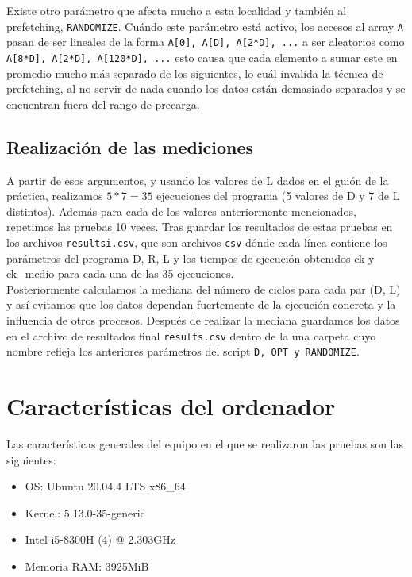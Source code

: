 \documentclass[a4paper,twocolumn]{article}
\begin{document}
    Existe otro parámetro que afecta mucho a esta localidad y también al prefetching, \texttt{RANDOMIZE}. Cuándo este parámetro está activo, los accesos al array \texttt{A} pasan de ser lineales de la forma \texttt{A[0], A[D], A[2*D], ...}  a ser aleatorios como \texttt{A[8*D], A[2*D], A[120*D], ...} esto causa que cada elemento a sumar este en promedio mucho más separado de los siguientes, lo cuál invalida la técnica de prefetching, al no servir de nada cuando los datos están demasiado separados y se encuentran fuera del rango de precarga. \\
    
    \subsection{Realización de las mediciones}
    \label{metodologia}
    A partir de esos argumentos, y usando los valores de L dados en el guión de la práctica, realizamos $ 5 * 7 = 35 $ ejecuciones del programa (5 valores de D y 7 de L distintos). Además para cada de los valores anteriormente mencionados, repetimos las pruebas 10 veces. Tras guardar los resultados de estas pruebas en los archivos \texttt{resultsi.csv}, que son archivos \texttt{csv} dónde cada línea contiene los parámetros del programa D, R, L y los tiempos de ejecución obtenidos ck y ck\_medio para cada una de las 35 ejecuciones. \\
    
    Posteriormente calculamos la mediana del número de ciclos para cada par (D, L) y así evitamos que los datos dependan fuertemente de la ejecución concreta y la influencia de otros procesos. Después de realizar la mediana guardamos los datos en el archivo de resultados final \texttt{results.csv} dentro de la una carpeta cuyo nombre refleja los anteriores parámetros del script \texttt{D, OPT y RANDOMIZE}.\par
	
	\section{Características del ordenador}
	Las características generales del equipo en el que se realizaron las pruebas son las siguientes:
	
	\begin{itemize}
        \item OS: Ubuntu 20.04.4 LTS x86\_64 
        \item Kernel: 5.13.0-35-generic 
        \item Intel i5-8300H (4) @ 2.303GHz
        \item Memoria RAM: 3925MiB
    \end{itemize}
    
\end{document}
